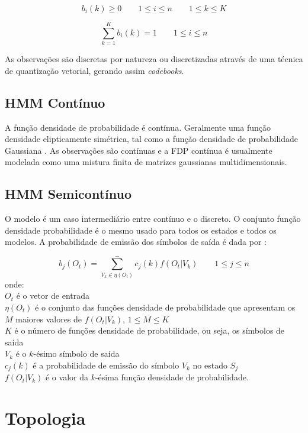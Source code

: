 $$
 \displaystyle  b_i (k) \geq 0 \qquad 1 \leq i \leq n  \qquad 1 \leq k \leq K
$$

\begin{equation}
\displaystyle \sum_{k=1}^K b_i (k) = 1 \qquad 1 \leq i \leq n 
\end{equation}

As observações são discretas por natureza ou discretizadas através de uma técnica de quantização vetorial, gerando assim \textit {codebooks}.
 
\subsection{HMM Contínuo}
\quad A função densidade de probabilidade é contínua. Geralmente uma função densidade elipticamente simétrica, tal como a função densidade de probabilidade Gaussiana \cite{fundRecFala}.
 As observações são contínuas e a FDP contínua é  usualmente modelada como uma mistura finita de matrizes gaussianas multidimensionais.
\subsection{HMM Semicontínuo}
\quad O modelo é um caso intermediário entre contínuo e o discreto. O conjunto função densidade probabilidade é o mesmo usado para todos os estados e todos os modelos. A probabilidade de emissão dos símbolos de saída é dada por :


\begin{equation}
\displaystyle b_j(O_t) =  \sum_{V_k \in \eta (O_t)}^-  c_j (k) f (O_t | V_k)   \qquad 1 \leq j \leq n 
\end{equation}
 onde:\\
$O_t$ é o vetor de entrada\\
$\eta(O_t)$ é o conjunto das funções densidade de probabilidade que apresentam os $M$ maiores valores de $f (O_t | V_k)$, $ 1 \leq M \leq K$\\
$K$ é o número de funções densidade de probabilidade, ou seja, os símbolos de saída\\
$V_k$ é o $k$-ésimo símbolo de saída\\
$ c_j (k)$ é a probabilidade de emissão do símbolo $V_k$ no estado $S_j$\\
$f (O_t | V_k)$ é o valor da $k$-ésima função densidade de probabilidade.



\section{Topologia}
\label{sec:topo}

